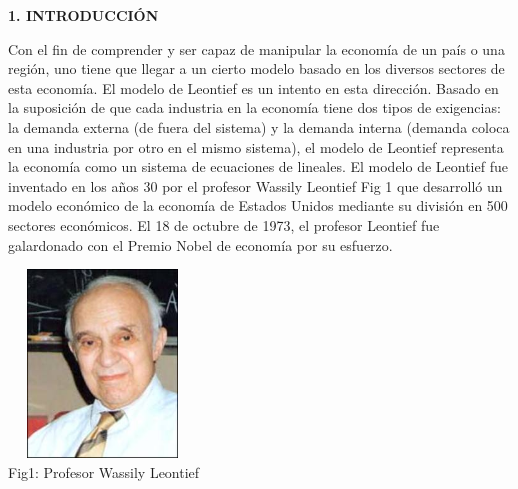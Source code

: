 \documentclass[10pt,a4paper]{article}
\begin{document}
\begin{multicols}{2}
\begin{center}
{\large \bf 1. INTRODUCCI\'ON}
\end{center}
 Con el fin de comprender y ser capaz de manipular la economía de un país o una región, uno tiene que llegar a un cierto modelo basado en los diversos sectores de esta economía. El modelo de Leontief es un intento en esta dirección. Basado en la suposición de que cada industria en la economía tiene dos tipos de exigencias: la demanda externa (de fuera del sistema) y la demanda interna (demanda coloca en una industria por otro en el mismo sistema), el modelo de Leontief representa la economía como un sistema de ecuaciones de lineales. El modelo de Leontief fue inventado en los años 30 por el profesor Wassily Leontief \color{blue} Fig 1 \color{black} que desarrolló un modelo económico de la economía de Estados Unidos mediante su división en 500 sectores económicos. El 18 de octubre de 1973, el profesor Leontief fue galardonado con el Premio Nobel de economía por su esfuerzo.\\
 
\begin{center}
	
	
	\centering
	\includegraphics[width=5cm,height=5cm]{leontief.jpg}
	\\
	Fig1: Profesor Wassily Leontief
\end{center}


\end{multicols}
\end{document}
